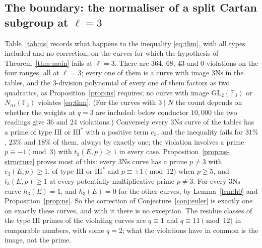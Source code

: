 \documentclass[11pt]{amsart}
\theoremstyle{definition}
\newcommand{\F}{\mathbb{F}}
\newcommand{\Ns}{3\mathrm{Ns}}
\newcommand{\GL}{\mathrm{GL}}
\begin{document}
\subsection{The boundary: the normaliser of a split Cartan subgroup at \texorpdfstring{$\ell=3$}{l=3}}\label{sec:anomaly}
Table~\ref{tab:ns} records what happens to the inequality \eqref{eq:thm}, with all types included and no correction, on the curves for which the hypothesis of Theorem~\ref{thm:main} fails at $\ell=3$. There are $364$, $68$, $43$ and $0$ violations on the four ranges, all at $\ell=3$; every one of them is a curve with image $\Ns$ in the tables, and the $3$-division polynomial of every one of them factors as two quadratics, as Proposition~\ref{prop:ns} requires; no curve with image $\GL_2(\F_3)$ or $N_{ns}(\F_3)$ violates \eqref{eq:thm}. (For the curves with $3\mid N$ the count depends on whether the weights at $q=3$ are included: below conductor $10{,}000$ the two readings give $36$ and $24$ violations.) Conversely every $\Ns$ curve of the tables has a prime of type $\mathrm{III}$ or $\mathrm{III}^*$ with a positive term $e_3$, and the inequality fails for $31\%$, $23\%$ and $18\%$ of them, always by exactly one; the violation involves a prime $p\equiv-1\pmod3$ with $t_3(E,p)\ge1$ in every case. Proposition~\ref{prop:ns-structure} proves most of this: every $\Ns$ curve has a prime $p\ne3$ with $e_3(E,p)\ge1$, of type $\mathrm{III}$ or $\mathrm{III}^*$ and $p\equiv\pm1\pmod{12}$ when $p\ge5$, and $t_3(E,p)\ge1$ at every potentially multiplicative prime $p\ne3$. For every $\Ns$ curve $h_3(E)=1$, and $h_3(E)=0$ for the other curves, by Lemma~\ref{lem:h0} and Proposition~\ref{prop:ns}. So the correction of Conjecture~\ref{conj:euler} is exactly one on exactly these curves, and with it there is no exception. The residue classes of the type $\mathrm{III}$ primes of the violating curves are $q\equiv1$ and $q\equiv11\pmod{12}$ in comparable numbers, with some $q=2$; what the violations have in common is the image, not the prime.

\begin{table}[ht]\centering\scriptsize\setlength{\tabcolsep}{3pt}

\caption{The curves with image $\Ns$ (mod $3$ image the normaliser of a split Cartan subgroup), with $E[3]$ irreducible, not CM, optimal: how many have a positive type $\mathrm{III}$ term, how many violate \eqref{eq:thm} (all types, no correction), how many other curves do, how many have $h_3(E)=1$, the residue classes mod $12$ of the type $\mathrm{III}$ primes of the violating curves (or $q=2$), and the shortfall.}\label{tab:ns}
\end{table}
\end{document}
